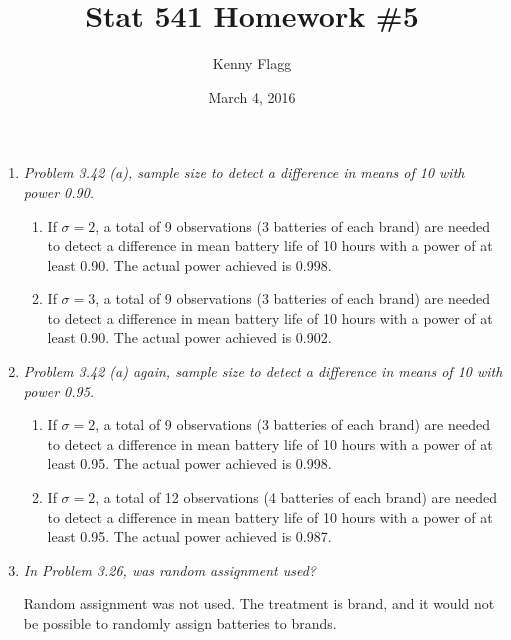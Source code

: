 \documentclass[11pt]{article}
\title{Stat 541 Homework \#5}
\author{Kenny Flagg}
\date{March 4, 2016}
\begin{document}
\maketitle

\begin{enumerate}

\item %
\emph{Problem 3.42 (a), sample size to detect a difference in means of 10 with power 0.90.}

\begin{enumerate}

\item %
If \(\sigma=2\), a total of 9 observations (3 batteries of each brand) are
needed to detect a difference in mean battery life of 10 hours with a power
of at least 0.90. The actual power achieved is 0.998.

\item %
If \(\sigma=3\), a total of 9 observations (3 batteries of each brand) are
needed to detect a difference in mean battery life of 10 hours with a power
of at least 0.90. The actual power achieved is 0.902.

\end{enumerate}

{\footnotesize}

\pagebreak
\item %
\emph{Problem 3.42 (a) again, sample size to detect a difference in means of 10 with power 0.95.}

\begin{enumerate}

\item %
If \(\sigma=2\), a total of 9 observations (3 batteries of each brand) are
needed to detect a difference in mean battery life of 10 hours with a power
of at least 0.95. The actual power achieved is 0.998.

\item %
If \(\sigma=2\), a total of 12 observations (4 batteries of each brand) are
needed to detect a difference in mean battery life of 10 hours with a power
of at least 0.95. The actual power achieved is 0.987.

\end{enumerate}

{\footnotesize}

\item %
\emph{In Problem 3.26, was random assignment used?}

Random assignment was not used. The treatment is brand, and it would not be
possible to randomly assign batteries to brands.


\end{enumerate}
\end{document}
